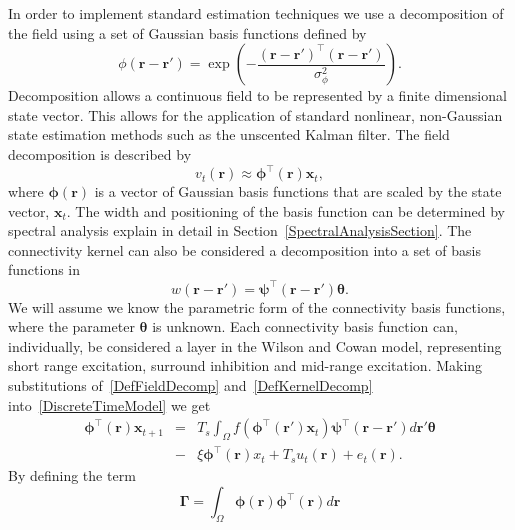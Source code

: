 \documentclass[12pt]{iopart}
\begin{document}
In order to implement standard estimation techniques we use a decomposition of the field using a set of Gaussian basis functions defined by
\begin{equation}\label{eq:FieldBasisFunction}
	\phi\left(\mathbf{r}-\mathbf{r}'\right) =
\exp{\left(-\frac{(\mathbf{r}-\mathbf{r}')^\top(\mathbf{r}-\mathbf{r}')}{\sigma_{\phi}^2}\right)}. 
\end{equation}
 Decomposition allows a continuous field to be represented by a finite dimensional state vector. This allows for the application of standard nonlinear, non-Gaussian state estimation methods such as the unscented Kalman filter. The field decomposition is described by 
\begin{equation}
	\label{DefFieldDecomp} v_t\left(\mathbf{r}\right) \approx \boldsymbol{\phi}^{\top}\left(\mathbf{r}\right) \mathbf{x}_t, 
\end{equation}
where $\mathbf{\boldsymbol{\phi}}(\mathbf{r})$ is a vector of Gaussian basis functions that are scaled by the state vector, $\mathbf{x}_t$. The width and positioning of the basis function can be determined by spectral analysis explain in detail in Section~\ref{SpectralAnalysisSection}. The connectivity kernel can also be considered a decomposition into a set of basis functions in 
\begin{equation}\label{DefKernelDecomp}
	 w\left(\mathbf{r}-\mathbf{r}'\right) =\boldsymbol{\psi}^\top\left(\mathbf{r}-\mathbf{r}'\right) \boldsymbol{\theta}.
\end{equation}
We will assume we know the parametric form of the connectivity basis functions, where the parameter $\boldsymbol{\theta}$ is unknown. Each connectivity basis function can, individually, be considered a layer in the Wilson and Cowan model, representing short range excitation, surround inhibition and mid-range excitation. Making substitutions of~\ref{DefFieldDecomp} and~\ref{DefKernelDecomp} into~\ref{DiscreteTimeModel} we get 
\begin{eqnarray}
	\label{reduced continuous model}\boldsymbol{\phi}^{\top}(\mathbf{r})\mathbf{x}_{t+1}&=& T_s\int_\Omega{f(\boldsymbol{\phi}^{\top}(\mathbf{r}')\mathbf{x}_t )\boldsymbol{\psi}^{\top}(\mathbf{r}-\mathbf{r}')d\mathbf{r}'}\boldsymbol{\theta}\nonumber \\ 
	&-& \xi\boldsymbol{\phi}^{\top}(\mathbf{r})x_t + T_s u_t(\mathbf{r})+ e_t(\mathbf{r}). 
\end{eqnarray}
By defining the term 
\begin{equation}
	\label{DefGamma} \boldsymbol{\Gamma} = \int_\Omega {\boldsymbol{\phi} \left(\mathbf{r}\right)\boldsymbol{\phi} ^{\top}\left(\mathbf{r}\right)d\mathbf{r}} 
\end{equation}
\end{document}
